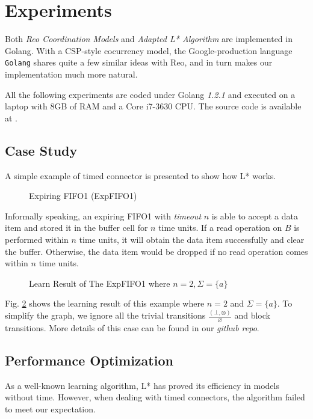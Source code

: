 \documentclass[conference, a4paper]{IEEEtran}
\newcommand{\rnoread}[0]{\otimes}
\newcommand{\rempty}[0]{\varnothing}
\begin{document}
\section{Experiments}  
\label{sec:experiment}

Both \emph{Reo Coordination Models} and \emph{Adapted L* Algorithm} are implemented in
Golang. With a CSP-style\cite{DBLP:books/ph/Hoare85} cocurrency model, the Google-production language
\texttt{Golang} shares quite a few similar ideas with Reo, and in turn makes our implementation much
more natural.

All the following experiments are coded under Golang \emph{1.2.1} and executed on a laptop with 8GB
of RAM and a Core i7-3630 CPU. The source code is available at \cite{reo-learn-github}.

\subsection{Case Study}
A simple example of timed connector is presented to show how L* works.
\begin{figure}[ht]
  \begin{center}
    
  \end{center}
  \caption{Expiring FIFO1 (ExpFIFO1)}
  \label{fig:expfifo}
\end{figure}

Informally speaking, an expiring FIFO1 with \emph{timeout} $n$ is able to accept a data item
and stored it in the buffer cell for $n$ time units. If a read operation on $B$ is performed within
$n$ time units, it will obtain the data item successfully and clear the buffer. Otherwise, the data
item would be dropped if no read operation comes within $n$ time units.

\begin{figure}[ht]
  \begin{center}
    
  \end{center}
  \caption{Learn Result of The ExpFIFO1 where $n=2,\Sigma=\{a\}$}
  \label{fig:expfifosemantics}
\end{figure}

Fig. \ref{fig:expfifosemantics} shows the learning result of this example where $n=2$ and
$\Sigma=\{a\}$.
To simplify the graph, we ignore all the trivial transitions $\frac{(\bot,\rnoread)}{\rempty}$
and block transitions. More details of this case can be found in our \emph{github repo}.

\subsection{Performance Optimization}
As a well-known learning algorithm, L* has proved its efficiency in models without time.
However, when dealing with timed connectors, the algorithm failed to meet our expectation.
\end{document}
